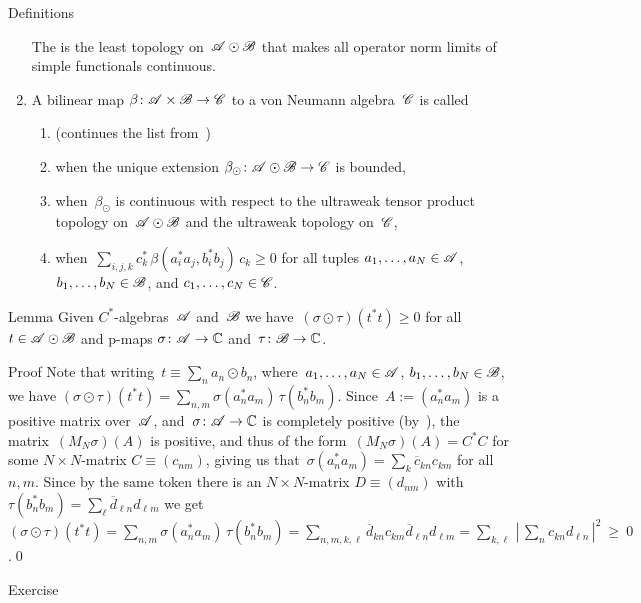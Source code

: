 \documentclass[a]{subfiles}
\begin{document}
\begin{parsec}
\begin{point}{Definitions}
\begin{enumerate}
The 
is the least topology on~$\mathscr{A}\odot\mathscr{B}$
that makes all operator norm limits
of simple functionals continuous.
\item
A bilinear map $\beta\colon \mathscr{A}\times \mathscr{B}\to\mathscr{C}$
to a von Neumann algebra~$\mathscr{C}$
is called
\begin{enumerate}
\item
(continues the list from~)
\item
{}
when the unique extension $\beta_\odot \colon \mathscr{A}\odot \mathscr{B}\to \mathscr{C}$
is bounded,
\item 
{}
when~$\beta_\odot$
is continuous with respect to the ultraweak tensor product topology 
on~$\mathscr{A}\odot\mathscr{B}$
and the ultraweak topology on~$\mathscr{C}$,
\item
{}
when~$\sum_{i,j,k}c_k^*\,\beta(a_i^*a_j,b_i^*b_j)\,c_k\geq 0$
for all tuples $a_1,\dotsc,a_N\in\mathscr{A}$,
$b_1,\dotsc,b_N\in\mathscr{B}$,
and $c_1,\dotsc,c_N\in\mathscr{C}$.
\end{enumerate}
\end{enumerate}
\end{point}
\begin{point}{Lemma}%
Given $C^*$-algebras~$\mathscr{A}$ and~$\mathscr{B}$
we have~$(\sigma\odot \tau) (t^*t)\geq 0$
for all  $t\in\mathscr{A}\odot\mathscr{B}$
and p-maps  $\sigma\colon \mathscr{A}\to\mathbb{C}$
and~$\tau\colon \mathscr{B}\to\mathbb{C}$.
\begin{point}{Proof}%
Note that writing~$t\equiv \sum_n a_n \odot b_n$,
where~$a_1,\dotsc,a_N\in \mathscr{A}$, $b_1,\dotsc,b_N\in \mathscr{B}$,
we have
$(\sigma\odot\tau)(t^*t)
= \sum_{n,m} \sigma(a_n^*a_m)\,\tau(b_n^*b_m)$.
Since~$A:=(a_n^*a_m)$
is a positive matrix over~$\mathscr{A}$,
and~$\sigma\colon \mathscr{A}\to\mathbb{C}$
is completely positive (by~),
the matrix~$(M_N\sigma)(A)$ is positive,
and thus of the form~$(M_N\sigma)(A) = C^*C$
for some $N\times N$-matrix  $C\equiv(c_{nm})$,
giving us that~$\sigma(a_n^*a_m)=\sum_k \overline{c}_{kn} c_{km}$
for all~$n,m$.
Since by the same token there is an $N\times N$-matrix
$D\equiv(d_{nm})$
with
$\tau(b_n^* b_m ) = \sum_\ell \overline{d}_{\ell n} d_{\ell m}$
we get
$(\sigma\odot\tau)(t^*t)
= \sum_{n,m} \sigma(a_n^*a_m)\,\tau(b_n^*b_m)
= \sum_{n,m,k,\ell } \overline{d}_{k n}
c_{k m} \overline{d}_{\ell n} d_{\ell m}
= \sum_{k,\ell}\,\left|\,\sum_{n} c_{k n} d_{\ell n}\,\right|^2
\ \geq\  0$.\qed
\end{point}
\end{point}
\begin{point}{Exercise}%

\end{point}
\end{parsec}
\end{document}
